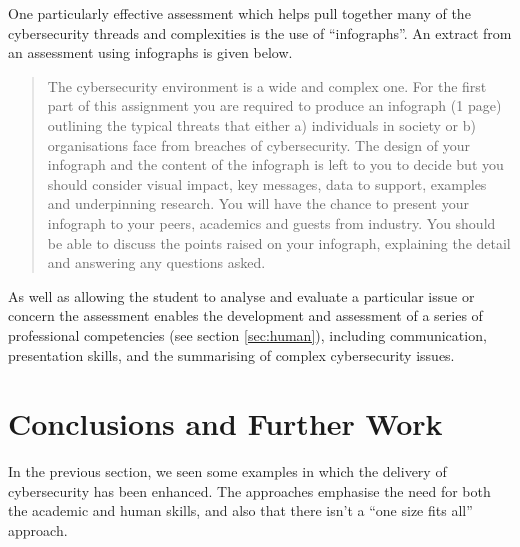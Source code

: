 \documentclass[conference]{IEEEtran}
\begin{document}
One particularly effective assessment which helps pull together many of the cybersecurity threads and complexities is the use of ``infographs''. An extract from an assessment using infographs is given below.
\begin{quote}
The cybersecurity environment is a wide and complex one. For the first part of this assignment you are required to produce an infograph (1 page) outlining the typical threats that either a) individuals in society or b) organisations face from breaches of cybersecurity. The design of your infograph and the content of the infograph is left to you to decide but you should consider visual impact, key messages, data to support, examples and underpinning research. You will have the chance to present your infograph to your peers, academics and guests from industry. You should be able to discuss the points raised on your infograph, explaining the detail and answering any questions asked. 
\end{quote}
As well as allowing the student to analyse and evaluate a particular issue or concern the assessment enables the development and assessment of a series of professional competencies (see section \ref{sec:human}), including communication, presentation skills, and the summarising of complex cybersecurity issues. 

\section{Conclusions and Further Work}

In the previous section, we seen some examples in which the delivery of cybersecurity has been enhanced. The approaches emphasise the need for both the academic and human skills, and also that there isn't a ``one size fits all'' approach. 
\end{document}
